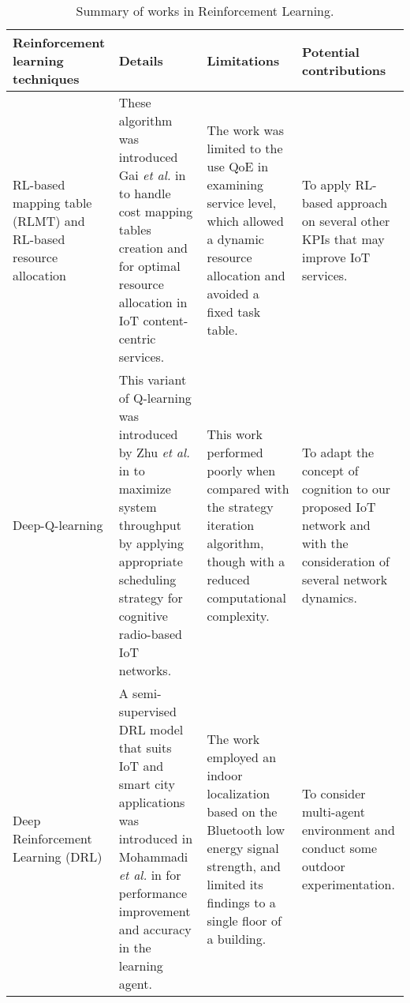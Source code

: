 \documentclass[journal]{IEEEtran}
\begin{document}
\pagestyle{empty}
\begin{landscape}



\renewcommand{\arraystretch}{1.2}


\begin{table}
\small
\centering
\caption{Summary of works in Reinforcement Learning.}


\centering

\label{table:review}
\begin{tabular}{llll}


  \hline
    Reinforcement learning techniques & Details  & Limitations & Potential contributions \\
  \hline \hline
  \multicolumn{1}{m{3cm}}{RL-based mapping table (RLMT) and RL-based resource allocation} & \multicolumn{1}{m{6cm}}{These algorithm was introduced Gai \emph{et al.} in \cite{Gai2018} to handle cost mapping tables creation and for optimal resource allocation in IoT content-centric services.} & \multicolumn{1}{m{6cm}}{The work was limited to the use QoE in examining service level, which allowed a dynamic resource allocation and avoided a fixed task table.} & \multicolumn{1}{m{8cm}}{To apply RL-based approach on several other KPIs that may improve IoT services.}\\ \hline

\multicolumn{1}{m{3cm}}{Deep-Q-learning} & \multicolumn{1}{m{6cm}}{This variant of Q-learning was introduced by Zhu \emph{et al.} in \cite{Zhu2018} to maximize system throughput by applying appropriate scheduling strategy for cognitive radio-based IoT networks.} & \multicolumn{1}{m{6cm}}{This work performed poorly when compared with the strategy iteration algorithm, though with a reduced computational complexity.} & \multicolumn{1}{m{6cm}}{To adapt the concept of cognition to our proposed IoT network and with the consideration of several network dynamics.}\\ \hline


\multicolumn{1}{m{3cm}}{Deep Reinforcement Learning (DRL)} & \multicolumn{1}{m{6cm}}{A semi-supervised DRL model that suits IoT and smart city applications was introduced in Mohammadi \emph{et al.} in \cite{Mohammadi2018} for performance improvement and accuracy in the learning agent.} & \multicolumn{1}{m{6cm}}{The work employed an indoor localization based on the Bluetooth low energy signal strength, and limited its findings to a single floor of a building.} & \multicolumn{1}{m{6cm}}{To consider multi-agent environment and conduct some outdoor experimentation.}\\ \hline



\end{tabular}
\end{table}
\end{landscape}
\end{document}
